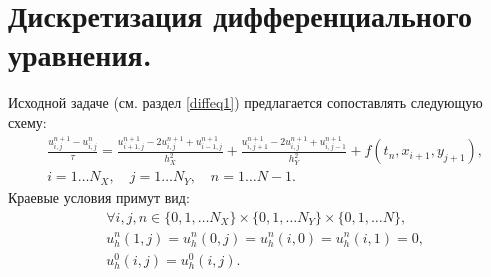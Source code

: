 \documentclass[14pt,a4paper]{extarticle}
\newcommand{\1}{\mathbbm{1}}
\begin{document}
\section{Дискретизация дифференциального уравнения.} \label{scheme1}
Исходной задаче (см. раздел \ref{diffeq1}) предлагается сопоставлять следующую схему:
\begin{align*}
    &\frac{u_{i, j}^{n+1} - u_{i, j}^n}{\tau} = \frac{u_{i+1, j}^{n+1} - 2 u_{i, j}^{n+1} + u_{i-1, j}^{n+1}}{h_X^2} + 
    \frac{u_{i, j+1}^{n+1} - 2 u_{i, j}^{n+1} + u_{i, j-1}^{n+1}}{h_Y^2} + f(t_{n}, x_{i+1}, y_{j+1}), \\
    & i = 1 \ldots N_X, \quad j = 1 \ldots N_Y, \quad n = 1 \ldots N-1.
\end{align*}
Краевые условия примут вид:
\begin{align*} 
    &\forall i, j, n \in \{0, 1, \ldots N_X\}\times\{0, 1, \ldots N_Y\}\times\{0, 1, \ldots N\} ,\\
    &u^n_h(1, j) = u^n_h(0, j) = u^n_h{(i, 0)} = u^n_h{(i, 1)} = 0, \\
    &u^0_h{(i, j)} = u^0_h(i, j). 
\end{align*}
\end{document}
